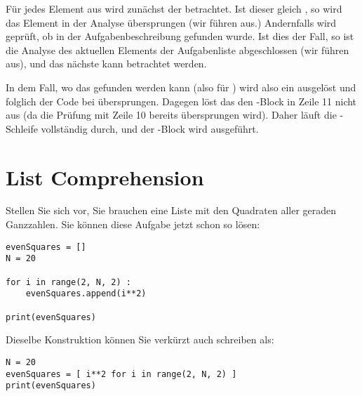 Für jedes Element aus  wird zunächst der  betrachtet. Ist dieser gleich , so wird das Element in der Analyse übersprungen (wir führen  aus.) Andernfalls wird geprüft, ob  in der Aufgabenbeschreibung  gefunden wurde. Ist dies der Fall, so ist die Analyse des aktuellen Elements der Aufgabenliste  abgeschlossen (wir führen  aus), und das nächste  kann betrachtet werden.

In dem Fall, wo das  gefunden werden kann (also \eg für ) wird also ein  ausgelöst und folglich der Code bei  übersprungen. Dagegen löst das  den -Block in Zeile 11 nicht aus (da die Prüfung mit Zeile 10 bereits übersprungen wird). Daher läuft die -Schleife vollständig durch, und der -Block wird ausgeführt.

\section{List Comprehension}
Stellen Sie sich vor, Sie brauchen eine Liste mit den Quadraten aller geraden Ganzzahlen. Sie können diese Aufgabe jetzt schon so lösen:

\begin{codebox}
\begin{verbatim}
evenSquares = []
N = 20

for i in range(2, N, 2) :
    evenSquares.append(i**2)

print(evenSquares)
\end{verbatim}
\end{codebox}

\begin{cmdbox}
\end{cmdbox}

Dieselbe Konstruktion können Sie verkürzt auch schreiben als:
\begin{codebox}
\begin{verbatim}
N = 20
evenSquares = [ i**2 for i in range(2, N, 2) ]
print(evenSquares)
\end{verbatim}
\end{codebox}

